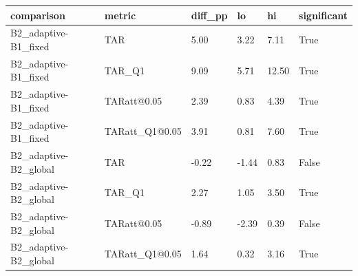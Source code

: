 \begin{tabular}{llllll}
\hline
comparison & metric & diff\_pp & lo & hi & significant \\
\hline
B2\_adaptive-B1\_fixed & TAR & 5.00 & 3.22 & 7.11 & True \\
B2\_adaptive-B1\_fixed & TAR\_Q1 & 9.09 & 5.71 & 12.50 & True \\
B2\_adaptive-B1\_fixed & TARatt@0.05 & 2.39 & 0.83 & 4.39 & True \\
B2\_adaptive-B1\_fixed & TARatt\_Q1@0.05 & 3.91 & 0.81 & 7.60 & True \\
B2\_adaptive-B2\_global & TAR & -0.22 & -1.44 & 0.83 & False \\
B2\_adaptive-B2\_global & TAR\_Q1 & 2.27 & 1.05 & 3.50 & True \\
B2\_adaptive-B2\_global & TARatt@0.05 & -0.89 & -2.39 & 0.39 & False \\
B2\_adaptive-B2\_global & TARatt\_Q1@0.05 & 1.64 & 0.32 & 3.16 & True \\
\hline
\end{tabular}
